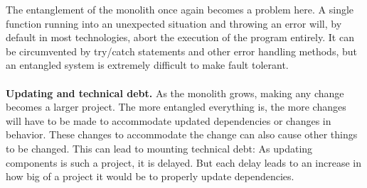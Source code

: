 The entanglement of the monolith once again becomes a problem here. 
A single function running into an unexpected situation and throwing an error will, by default in most technologies, abort the execution of the program entirely.
It can be circumvented by try/catch statements and other error handling methods, but an entangled system is extremely difficult to make fault tolerant. \\
\\
\textbf{Updating and technical debt.} As the monolith grows, making any change becomes a larger project.
The more entangled everything is, the more changes will have to be made to accommodate updated dependencies or changes in behavior. 
These changes to accommodate the change can also cause other things to be changed.
This can lead to mounting technical debt: As updating components is such a project, it is delayed.
But each delay leads to an increase in how big of a project it would be to properly update dependencies.
